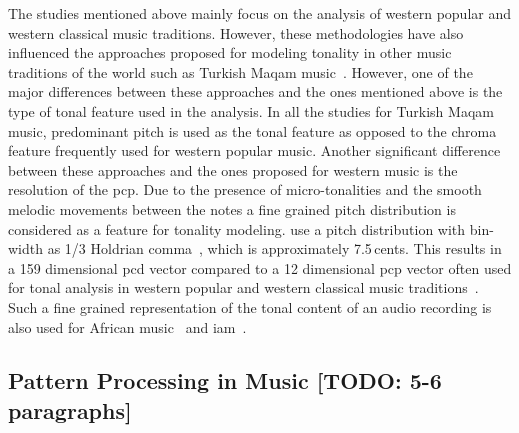 The studies mentioned above mainly focus on the analysis of western popular and western classical music traditions. However, these methodologies have also influenced the approaches proposed for modeling tonality in other music traditions of the world such as Turkish Maqam music~\cite{gedik2010pitch,gedik2009evaluation,bozkurt2008automatic}. However, one of the major differences between these approaches and the ones mentioned above is the type of tonal feature used in the analysis. In all the studies for Turkish Maqam music, predominant pitch is used as the tonal feature as opposed to the chroma feature frequently used for western popular music. Another significant difference between these approaches and the ones proposed for western music is the resolution of the \gls{pcp}. Due to the presence of micro-tonalities and the smooth melodic movements between the notes a fine grained pitch distribution is considered as a feature for tonality modeling. \cite{bozkurt2008automatic,gedik2010pitch} use a pitch distribution with bin-width as 1/3 Holdrian comma~\cite{akkocc2002non}, which is approximately 7.5\,cents. This results in a 159 dimensional \gls{pcd} vector compared to a 12 dimensional \gls{pcp} vector often used for tonal analysis in western popular and western classical music traditions~\cite{gomez2006tonal}. Such a fine grained representation of the tonal content of an audio recording is also used for African music~\citep{moelants2009exploring} and \acrfull{iam}~\citep{chordia2013joint}. 



\subsection{Pattern Processing in Music [TODO: 5-6 paragraphs]}
\label{sec:pattern_processin_in_music}


